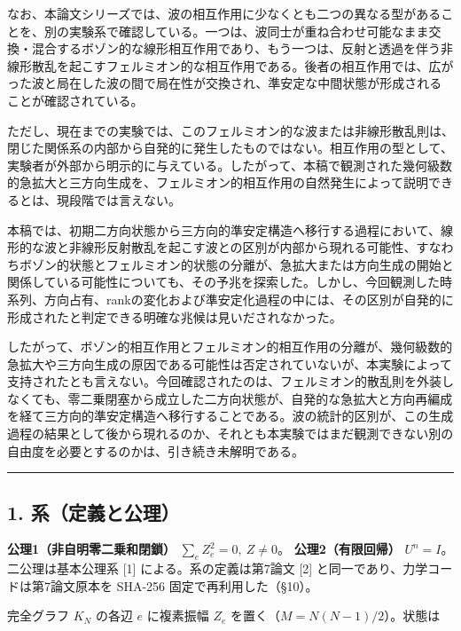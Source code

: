 \documentclass[
  a4paper,
]{ltjsarticle}
\begin{document}
なお、本論文シリーズでは、波の相互作用に少なくとも二つの異なる型があることを、別の実験系で確認している。一つは、波同士が重ね合わせ可能なまま交換・混合するボゾン的な線形相互作用であり、もう一つは、反射と透過を伴う非線形散乱を起こすフェルミオン的な相互作用である。後者の相互作用では、広がった波と局在した波の間で局在性が交換され、準安定な中間状態が形成されることが確認されている。

ただし、現在までの実験では、このフェルミオン的な波または非線形散乱則は、閉じた関係系の内部から自発的に発生したものではない。相互作用の型として、実験者が外部から明示的に与えている。したがって、本稿で観測された幾何級数的急拡大と三方向生成を、フェルミオン的相互作用の自然発生によって説明できるとは、現段階では言えない。

本稿では、初期二方向状態から三方向的準安定構造へ移行する過程において、線形的な波と非線形反射散乱を起こす波との区別が内部から現れる可能性、すなわちボゾン的状態とフェルミオン的状態の分離が、急拡大または方向生成の開始と関係している可能性についても、その予兆を探索した。しかし、今回観測した時系列、方向占有、rankの変化および準安定化過程の中には、その区別が自発的に形成されたと判定できる明確な兆候は見いだされなかった。

したがって、ボゾン的相互作用とフェルミオン的相互作用の分離が、幾何級数的急拡大や三方向生成の原因である可能性は否定されていないが、本実験によって支持されたとも言えない。今回確認されたのは、フェルミオン的散乱則を外装しなくても、零二乗閉塞から成立した二方向状態が、自発的な急拡大と方向再編成を経て三方向的準安定構造へ移行することである。波の統計的区別が、この生成過程の結果として後から現れるのか、それとも本実験ではまだ観測できない別の自由度を必要とするのかは、引き続き未解明である。

\begin{center}\rule{0.5\linewidth}{0.5pt}\end{center}

\subsection{1.
系（定義と公理）}\label{ux7cfbux5b9aux7fa9ux3068ux516cux7406}

\textbf{公理1（非自明零二乗和閉鎖）} \(\sum_e Z_e^2=0,\ Z\neq0\)。
\textbf{公理2（有限回帰）} \(U^n=I\)。二公理は基本公理系 {[}1{]}
による。系の定義は第7論文 {[}2{]}
と同一であり、力学コードは第7論文原本を SHA-256
固定で再利用した（§10）。

完全グラフ \(K_N\) の各辺 \(e\) に複素振幅 \(Z_e\)
を置く（\(M=N(N-1)/2\)）。状態は
\end{document}
